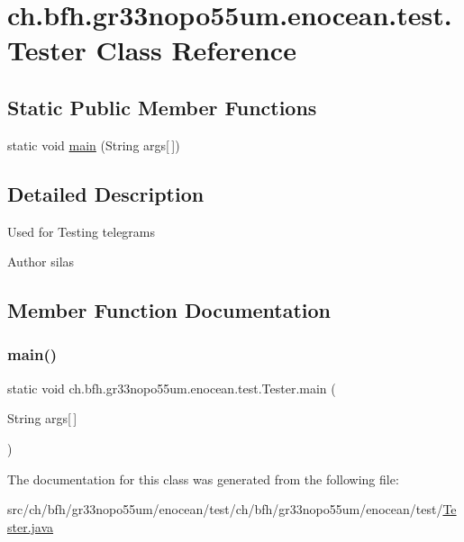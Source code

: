 \hypertarget{classch_1_1bfh_1_1gr33nopo55um_1_1enocean_1_1test_1_1_tester}{}\section{ch.\+bfh.\+gr33nopo55um.\+enocean.\+test.\+Tester Class Reference}
\label{classch_1_1bfh_1_1gr33nopo55um_1_1enocean_1_1test_1_1_tester}
\subsection*{Static Public Member Functions}
\begin{DoxyCompactItemize}
\item 
static void \hyperlink{classch_1_1bfh_1_1gr33nopo55um_1_1enocean_1_1test_1_1_tester_a26bb625fe2bc3a85f9f657c295a664be}{main} (String args\mbox{[}$\,$\mbox{]})
\end{DoxyCompactItemize}


\subsection{Detailed Description}
Used for Testing telegrams

\begin{DoxyAuthor}{Author}
silas 
\end{DoxyAuthor}


\subsection{Member Function Documentation}
\hypertarget{classch_1_1bfh_1_1gr33nopo55um_1_1enocean_1_1test_1_1_tester_a26bb625fe2bc3a85f9f657c295a664be}{}\label{classch_1_1bfh_1_1gr33nopo55um_1_1enocean_1_1test_1_1_tester_a26bb625fe2bc3a85f9f657c295a664be} 
\subsubsection{\texorpdfstring{main()}{main()}}
{\footnotesize\ttfamily static void ch.\+bfh.\+gr33nopo55um.\+enocean.\+test.\+Tester.\+main (\begin{DoxyParamCaption}\item[{String}]{args\mbox{[}$\,$\mbox{]} }\end{DoxyParamCaption})\hspace{0.3cm}{\ttfamily [static]}}



The documentation for this class was generated from the following file\+:\begin{DoxyCompactItemize}
\item 
src/ch/bfh/gr33nopo55um/enocean/test/ch/bfh/gr33nopo55um/enocean/test/\hyperlink{_tester_8java}{Tester.\+java}\end{DoxyCompactItemize}
